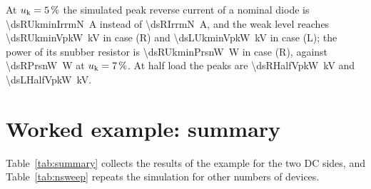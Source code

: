 \documentclass[10pt,a4paper]{scrartcl}
\newcommand{\uk}{u_\mathrm{k}}
\newcommand{\caseR}{(R)}
\newcommand{\caseL}{(L)}
\begin{document}
At $\uk = \dsUkMin\,\%$ the simulated peak reverse current of a nominal diode is \SI{\dsRUkminIrrmN}{\ampere} instead of \SI{\dsRIrrmN}{\ampere}, and the weak level reaches \SI{\dsRUkminVpkW}{\kilo\volt} in case \caseR{} and \SI{\dsLUkminVpkW}{\kilo\volt} in case \caseL{}; the power of its snubber resistor is \SI{\dsRUkminPrsnW}{\watt} in case \caseR{}, against \SI{\dsRPrsnW}{\watt} at $\uk = \dsUk\,\%$. At half load the peaks are \SI{\dsRHalfVpkW}{\kilo\volt} and \SI{\dsLHalfVpkW}{\kilo\volt}.

\section{Worked example: summary}
\label{sec:summary}
Table~\ref{tab:summary} collects the results of the example for the two DC sides, and Table~\ref{tab:nsweep} repeats the simulation for other numbers of devices.
\end{document}
